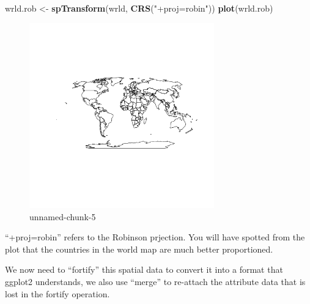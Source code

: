 \documentclass[]{article}
\newenvironment{Shaded}{}{}
\newcommand{\KeywordTok}[1]{\textcolor[rgb]{0.00,0.44,0.13}{\textbf{{#1}}}}
\newcommand{\StringTok}[1]{\textcolor[rgb]{0.25,0.44,0.63}{{#1}}}
\newcommand{\NormalTok}[1]{{#1}}
\let\Oldincludegraphics\includegraphics
\renewcommand{\includegraphics}[1]{\Oldincludegraphics[width=8cm]{#1}}
\begin{document}
\begin{Shaded}
\begin{Highlighting}[]
\NormalTok{wrld.rob <- }\KeywordTok{spTransform}\NormalTok{(wrld, }\KeywordTok{CRS}\NormalTok{(}\StringTok{"+proj=robin"}\NormalTok{))}
\KeywordTok{plot}\NormalTok{(wrld.rob)}
\end{Highlighting}
\end{Shaded}
\begin{figure}[htbp]
\centering
\includegraphics{figure/unnamed-chunk-5.png}
\caption{unnamed-chunk-5}
\end{figure}

``+proj=robin'' refers to the Robinson prjection. You will have spotted
from the plot that the countries in the world map are much better
proportioned.

We now need to ``fortify'' this spatial data to convert it into a format
that ggplot2 understands, we also use ``merge'' to re-attach the
attribute data that is lost in the fortify operation.
\end{document}
